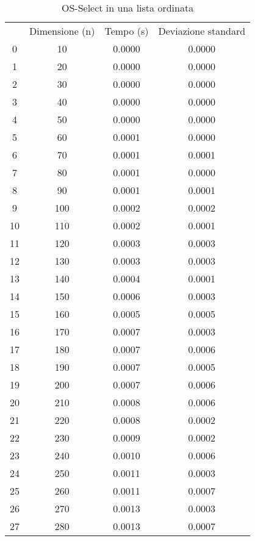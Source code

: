 \begin{table}
\centering
\caption{OS-Select in una lista ordinata}
\label{OS-Select in una lista ordinata}
\begin{adjustbox}{width=1\textwidth/2}
\begin{tabular}{|c|c|c|c|}
\hline
 & Dimensione (n) & Tempo (s) & Deviazione standard \\
0 & 10 & 0.0000 & 0.0000 \\
\cline{1-4}
1 & 20 & 0.0000 & 0.0000 \\
\cline{1-4}
2 & 30 & 0.0000 & 0.0000 \\
\cline{1-4}
3 & 40 & 0.0000 & 0.0000 \\
\cline{1-4}
4 & 50 & 0.0000 & 0.0000 \\
\cline{1-4}
5 & 60 & 0.0001 & 0.0000 \\
\cline{1-4}
6 & 70 & 0.0001 & 0.0001 \\
\cline{1-4}
7 & 80 & 0.0001 & 0.0000 \\
\cline{1-4}
8 & 90 & 0.0001 & 0.0001 \\
\cline{1-4}
9 & 100 & 0.0002 & 0.0002 \\
\cline{1-4}
10 & 110 & 0.0002 & 0.0001 \\
\cline{1-4}
11 & 120 & 0.0003 & 0.0003 \\
\cline{1-4}
12 & 130 & 0.0003 & 0.0003 \\
\cline{1-4}
13 & 140 & 0.0004 & 0.0001 \\
\cline{1-4}
14 & 150 & 0.0006 & 0.0003 \\
\cline{1-4}
15 & 160 & 0.0005 & 0.0005 \\
\cline{1-4}
16 & 170 & 0.0007 & 0.0003 \\
\cline{1-4}
17 & 180 & 0.0007 & 0.0006 \\
\cline{1-4}
18 & 190 & 0.0007 & 0.0005 \\
\cline{1-4}
19 & 200 & 0.0007 & 0.0006 \\
\cline{1-4}
20 & 210 & 0.0008 & 0.0006 \\
\cline{1-4}
21 & 220 & 0.0008 & 0.0002 \\
\cline{1-4}
22 & 230 & 0.0009 & 0.0002 \\
\cline{1-4}
23 & 240 & 0.0010 & 0.0006 \\
\cline{1-4}
24 & 250 & 0.0011 & 0.0003 \\
\cline{1-4}
25 & 260 & 0.0011 & 0.0007 \\
\cline{1-4}
26 & 270 & 0.0013 & 0.0003 \\
\cline{1-4}
27 & 280 & 0.0013 & 0.0007 \\

\end{tabular}
\end{adjustbox}
\end{table}

